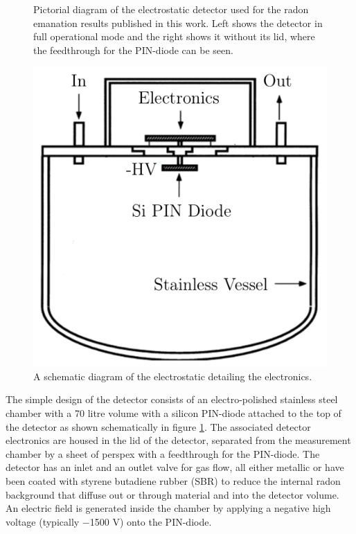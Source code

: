 \begin{figure}[h!]
    \caption[Pictorial diagram of the electrostatic detector used for the radon emanation results published in this work.]
    {Pictorial diagram of the electrostatic detector used for the radon emanation results published in this work. Left shows the detector in full operational mode and the right shows it without its lid, where the feedthrough for the PIN-diode can be seen.}
    \label{fig:elecrostatic_detector}
    \vspace{2cm}
    \includegraphics[scale=0.5]{Chapter_4/Figures/electrostatic_detector_schematic.png}
    \caption[A schematic diagram of the electrostatic detailing the electronics.]
    {A schematic diagram of the electrostatic detailing the electronics.}
    \label{fig:elecrostatic_detector_schematic}
\end{figure}
%

The simple design of the detector consists of an electro-polished stainless steel chamber with a 70 litre volume with a silicon PIN-diode attached to the top of the detector as shown schematically in figure \ref{fig:elecrostatic_detector_schematic}. The associated detector electronics are housed in the lid of the detector, separated from the measurement chamber by a sheet of perspex with a feedthrough for the PIN-diode. The detector has an inlet and an outlet valve for gas flow, all either metallic or have been coated with styrene butadiene rubber (SBR) to reduce the internal radon background that diffuse out or through material and into the detector volume. An electric field is generated inside the chamber by applying a negative high voltage (typically −1500 V) onto the PIN-diode.
 
